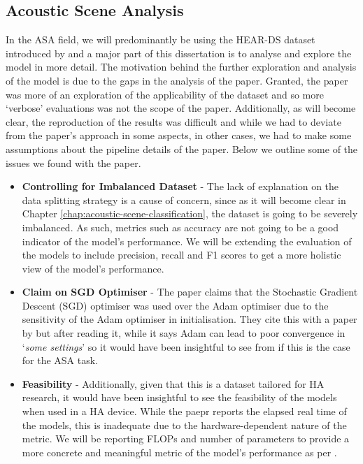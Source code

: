 \documentclass[logo,bsc,singlespacing,parskip,online]{infthesis}
\begin{document}
\subsection{Acoustic Scene Analysis}
In the ASA field, we will predominantly be using the HEAR-DS dataset introduced by \citet{Huwel2020HearDS}
and a major part of this dissertation is to analyse and explore the model in more detail.
The motivation behind the further exploration and analysis of the model is due 
to the gaps in the analysis of the paper. Granted, the paper was more of an exploration of the applicability of the dataset 
and so more `verbose' evaluations was not the scope of the paper. 
Additionally, as will become clear, the reproduction of the results 
was difficult and while we had to deviate from the paper's approach 
in some aspects, in other cases, we had to make some assumptions 
about the pipeline details of the paper. 
Below we outline some of the issues we found with the paper.
\begin{itemize}
   \item \textbf{Controlling for Imbalanced Dataset} - The lack of explanation on the data splitting strategy 
   is a cause of concern, since as it will become clear in Chapter \ref{chap:acoustic-scene-classification},
   the dataset is going to be severely imbalanced. As such, metrics such as accuracy are not going to be a good 
   indicator of the model's performance. We will be extending the evaluation of the models to include 
   precision, recall and F1 scores to get a more holistic view of the model's performance. 
   \item \textbf{Claim on SGD Optimiser} - The paper claims that the Stochastic Gradient Descent (SGD) 
   optimiser was used over the Adam optimiser due to the sensitivity of the Adam optimiser in 
   initialisation. They cite this with a paper by \citet{} 
   but after reading it, while it says 
   Adam can lead to poor convergence in `\textit{some settings}'
   so it would have been insightful to see from \citet{Huwel2020HearDS}
   if this is the case for the ASA task.
   \item \textbf{Feasibility} - Additionally, given that 
   this is a dataset tailored for HA research, it would have been insightful 
   to see the feasibility of the models when used in a HA device. While the paepr 
   reports the elapsed real time of the models, this 
   is inadequate due to the hardware-dependent nature of the metric. 
   We will be reporting FLOPs and number of parameters to provide a more 
   concrete and meaningful metric of the model's performance as per \citet{schwartz2019greenai}.
\end{itemize}
\end{document}
